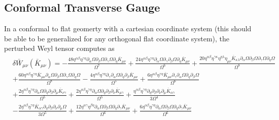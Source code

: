 \documentclass[10pt,letterpaper]{article}
\numberwithin{equation}{section}
\begin{document}
\subsection{Conformal Transverse Gauge}
In a conformal to flat geomerty with a cartesian coordinate system (this should be able to be generalized for any orthogonal flat coordinate system), the perturbed Weyl tensor computes as
\begin{align}
	&\delta \bar W_{\mu\nu}(\bar K_{\mu\nu}) = 
- \frac{48 \eta^{\alpha \beta} \eta^{\gamma \eta} \partial_{\alpha}\Omega \partial_{\beta}\Omega \partial_{\gamma}\Omega \partial_{\eta}\overline{K}_{\mu \nu}}{\Omega^7} + \frac{24 \eta^{\alpha \beta} \eta^{\gamma \eta} \partial_{\alpha}\Omega \partial_{\gamma}\partial_{\beta}\Omega \partial_{\eta}\overline{K}_{\mu \nu}}{\Omega^6} + \frac{20 \eta^{\alpha \beta} \eta^{\gamma \kappa} \eta^{\eta \lambda} \eta_{\mu \nu} \overline{K}_{\kappa \lambda} \partial_{\alpha}\Omega \partial_{\beta}\Omega \partial_{\gamma}\Omega \partial_{\eta}\Omega}{\Omega^8}  \nonumber \\
 &+ \frac{60 \eta^{\alpha \beta} \eta^{\gamma \eta} \overline{K}_{\mu \nu} \partial_{\alpha}\Omega \partial_{\beta}\Omega \partial_{\gamma}\Omega \partial_{\eta}\Omega}{\Omega^8} -  \frac{4 \eta^{\alpha \beta} \eta^{\gamma \eta} \partial_{\gamma}\partial_{\alpha}\Omega \partial_{\eta}\partial_{\beta}\overline{K}_{\mu \nu}}{\Omega^5} + \frac{6 \eta^{\alpha \beta} \eta^{\gamma \eta} \overline{K}_{\mu \nu} \partial_{\gamma}\partial_{\alpha}\Omega \partial_{\eta}\partial_{\beta}\Omega}{\Omega^6} \\
&+ \frac{2 \eta^{\alpha \beta} \eta^{\gamma \eta} \partial_{\alpha}\Omega \partial_{\eta}\partial_{\beta}\partial_{\mu}\overline{K}_{\nu \gamma}}{\Omega^5} + \frac{2 \eta^{\alpha \beta} \eta^{\gamma \eta} \partial_{\alpha}\Omega \partial_{\eta}\partial_{\beta}\partial_{\nu}\overline{K}_{\mu \gamma}}{\Omega^5} + \frac{\eta^{\alpha \beta} \eta^{\gamma \eta} \partial_{\eta}\partial_{\beta}\partial_{\nu}\partial_{\mu}\overline{K}_{\alpha \gamma}}{3 \Omega^4} \nonumber \\
&-  \frac{2 \eta^{\alpha \beta} \eta^{\gamma \eta} \overline{K}_{\alpha \gamma} \partial_{\eta}\partial_{\beta}\partial_{\nu}\partial_{\mu}\Omega}{3 \Omega^5} + \frac{12 \eta^{\alpha \gamma} \eta^{\beta \eta} \partial_{\alpha}\Omega \partial_{\beta}\Omega \partial_{\eta}\partial_{\gamma}\overline{K}_{\mu \nu}}{\Omega^6} + \frac{6 \eta^{\alpha \beta} \eta^{\gamma \eta} \partial_{\alpha}\Omega \partial_{\beta}\Omega \partial_{\eta}\partial_{\gamma}\overline{K}_{\mu \nu}}{\Omega^6} \nonumber \\

\end{align}
\end{document}
